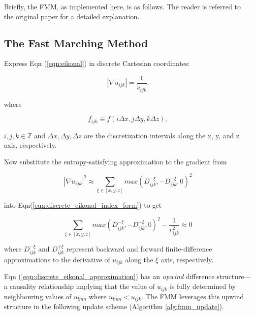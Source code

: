 		Briefly, the FMM, as implemented here, is as follows. The reader is referred to the original paper \cite{Sethian1996} for a detailed explanation.
		\par
		
	\subsection{The Fast Marching Method}
		Express Eqn (\ref{eqn:eikonal}) in discrete Cartesian coordinates:
		
		\begin{equation}
			\label{eqn:discrete_eikonal_index_form}
			\left|\nabla u_{ijk}\right| = \frac{1}{v_{ijk}}.
		\end{equation}
	
		\noindent where
	
		\begin{equation}
			f_{ijk} \equiv f\left(i\Delta x, j\Delta y, k\Delta z\right),
		\end{equation}
		
		\noindent $i, j, k \in \mathbb{Z}$ and $\Delta x, \Delta y, \Delta z$ are the discretization intervals along the x, y, and z axis, respectively.
		\par
		
		Now substitute the entropy-satisfying approximation to the gradient from 
		
		\begin{equation}
			\label{eqn:gradient_approximation}
			\left|\nabla u_{ijk}\right| ^2 \approx 
			\sum_{\xi \in \left[x, y, z\right]} max\left(D^{-\xi}_{ijk}, -D^{+\xi}_{ijk}, 0 \right)^2
		\end{equation}
		
		\noindent into Eqn(\ref{eqn:discrete_eikonal_index_form}) to get
		
		\begin{equation}
			\label{eqn:discrete_eikonal_approximation}
			\sum_{\xi \in \left[x, y, z\right]} max\left(D^{-\xi}_{ijk}, -D^{+\xi}_{ijk}, 0 \right)^2 - \frac{1}{v^2_{ijk}} \approx 0
		\end{equation}
		
		\noindent where $D^{-\xi}_{ijk}$ and $D^{+\xi}_{ijk}$ represent backward and forward finite-difference approximations to the derivative of $u_{ijk}$ along the $\xi$ axis, respectively.
		\par
		
		Eqn (\ref{eqn:discrete_eikonal_approximation}) has an \textit{upwind} difference structure---a causality relationship implying that the value of $u_{ijk}$ is fully determined by neighbouring values of $u_{lmn}$ where $u_{lmn} < u_{ijk}$. The FMM leverages this upwind structure in the following update scheme (Algorithm \ref{alg:fmm_update}).
		\par
		
